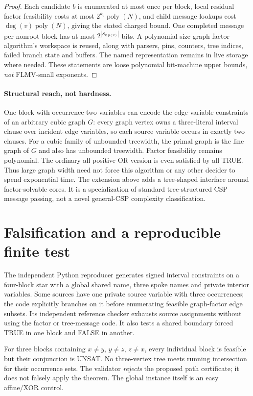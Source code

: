 \documentclass[11pt]{article}
\begin{document}
\begin{proof}
Each candidate $b$ is enumerated at most once per block, local
residual factor feasibility costs at most $2^{k_v}\operatorname{poly}(N)$,
and child message lookups cost $\deg(v)\operatorname{poly}(N)$,
giving the stated charged bound. One completed message per nonroot
block has at most $2^{|S_{v,p(v)}|}$ bits. A polynomial-size graph-factor
algorithm's workspace is reused, along with parsers, pins, counters,
tree indices, failed branch state and buffers. The named representation
remains in live storage where needed. These statements are loose
polynomial bit-machine upper bounds, \emph{not} FLMV-small exponents.
\end{proof}

\paragraph{Structural reach, not hardness.}
One block with occurrence-two variables can encode the edge-variable
constraints of an arbitrary cubic graph $G$: every graph vertex owns
a three-literal interval clause over incident edge variables, so each
source variable occurs in exactly two clauses. For a cubic family of
unbounded treewidth, the primal graph is the line graph of $G$ and also
has unbounded treewidth. Factor feasibility remains polynomial.
The ordinary all-positive OR version is even satisfied by all-TRUE.
Thus large graph width need not force this algorithm or any other
decider to spend exponential time. The extension above adds a
tree-shaped interface around factor-solvable cores. It is a
specialization of standard tree-structured CSP message passing,
not a novel general-CSP complexity classification.

\section{Falsification and a reproducible finite test}
The independent Python reproducer generates signed interval constraints
on a four-block star with a global shared name, three spoke names and
private interior variables. Some sources have one private source
variable with three occurrences; the code explicitly branches on it
before enumerating feasible graph-factor edge subsets. Its independent
reference checker exhausts source assignments without using the
factor or tree-message code. It also tests a shared boundary forced
TRUE in one block and FALSE in another.

For three blocks containing $x\ne y$, $y\ne z$, $z\ne x$, every
individual block is feasible but their conjunction is UNSAT. No
three-vertex tree meets running intersection for their occurrence
sets. The validator \emph{rejects} the proposed path certificate;
it does not falsely apply the theorem. The global instance itself
is an easy affine/XOR control.
\end{document}
